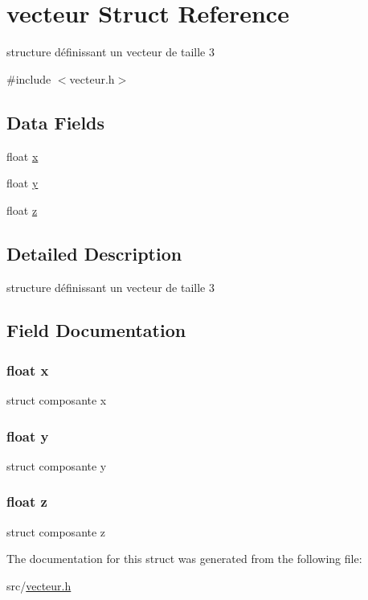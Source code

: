 \hypertarget{structvecteur}{
\section{vecteur Struct Reference}
\label{structvecteur}
}


structure définissant un vecteur de taille 3  




{\ttfamily \#include $<$vecteur.h$>$}

\subsection*{Data Fields}
\begin{DoxyCompactItemize}
\item 
float \hyperlink{structvecteur_ad0da36b2558901e21e7a30f6c227a45e}{x}
\item 
float \hyperlink{structvecteur_aa4f0d3eebc3c443f9be81bf48561a217}{y}
\item 
float \hyperlink{structvecteur_af73583b1e980b0aa03f9884812e9fd4d}{z}
\end{DoxyCompactItemize}


\subsection{Detailed Description}
structure définissant un vecteur de taille 3 

\subsection{Field Documentation}
\hypertarget{structvecteur_ad0da36b2558901e21e7a30f6c227a45e}{
\subsubsection[{x}]{\setlength{\rightskip}{0pt plus 5cm}float {\bf x}}}
\label{structvecteur_ad0da36b2558901e21e7a30f6c227a45e}
struct composante x \hypertarget{structvecteur_aa4f0d3eebc3c443f9be81bf48561a217}{
\subsubsection[{y}]{\setlength{\rightskip}{0pt plus 5cm}float {\bf y}}}
\label{structvecteur_aa4f0d3eebc3c443f9be81bf48561a217}
struct composante y \hypertarget{structvecteur_af73583b1e980b0aa03f9884812e9fd4d}{
\subsubsection[{z}]{\setlength{\rightskip}{0pt plus 5cm}float {\bf z}}}
\label{structvecteur_af73583b1e980b0aa03f9884812e9fd4d}
struct composante z 

The documentation for this struct was generated from the following file:\begin{DoxyCompactItemize}
\item 
src/\hyperlink{vecteur_8h}{vecteur.h}\end{DoxyCompactItemize}
